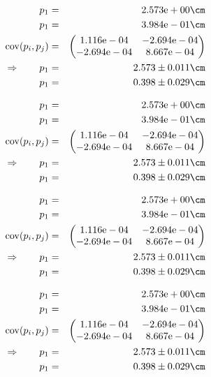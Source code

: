 \begin{eqnarray}
    p_1 &=& 2.573\mathrm{e}+00 \cm \nonumber \\
    p_1 &=& 3.984\mathrm{e}-01 \cm \nonumber \\
    \mathrm{cov}(p_i, p_j) &=& 
    \begin{pmatrix}
        1.116\mathrm{e}-04 &-2.694\mathrm{e}-04 \\
        -2.694\mathrm{e}-04 &8.667\mathrm{e}-04 \\
    \end{pmatrix}
\\ \Rightarrow \qquad
    p_1 &=& 2.573 \pm 0.011 \cm\\
    p_1 &=& 0.398 \pm 0.029 \cm
\end{eqnarray}

\begin{eqnarray}
    p_1 &=& 2.573\mathrm{e}+00 \cm \nonumber \\
    p_1 &=& 3.984\mathrm{e}-01 \cm \nonumber \\
    \mathrm{cov}(p_i, p_j) &=& 
    \begin{pmatrix}
        1.116\mathrm{e}-04 &-2.694\mathrm{e}-04 \\
        -2.694\mathrm{e}-04 &8.667\mathrm{e}-04 \\
    \end{pmatrix}
\\ \Rightarrow \qquad
    p_1 &=& 2.573 \pm 0.011 \cm\\
    p_1 &=& 0.398 \pm 0.029 \cm
\end{eqnarray}

\begin{eqnarray}
    p_1 &=& 2.573\mathrm{e}+00 \cm \nonumber \\
    p_1 &=& 3.984\mathrm{e}-01 \cm \nonumber \\
    \mathrm{cov}(p_i, p_j) &=& 
    \begin{pmatrix}
        1.116\mathrm{e}-04 &-2.694\mathrm{e}-04 \\
        -2.694\mathrm{e}-04 &8.667\mathrm{e}-04 \\
    \end{pmatrix}
\\ \Rightarrow \qquad
    p_1 &=& 2.573 \pm 0.011 \cm\\
    p_1 &=& 0.398 \pm 0.029 \cm
\end{eqnarray}

\begin{eqnarray}
    p_1 &=& 2.573\mathrm{e}+00 \cm \nonumber \\
    p_1 &=& 3.984\mathrm{e}-01 \cm \nonumber \\
    \mathrm{cov}(p_i, p_j) &=& 
    \begin{pmatrix}
        1.116\mathrm{e}-04 &-2.694\mathrm{e}-04 \\
        -2.694\mathrm{e}-04 &8.667\mathrm{e}-04 \\
    \end{pmatrix}
\\ \Rightarrow \qquad
    p_1 &=& 2.573 \pm 0.011 \cm\\
    p_1 &=& 0.398 \pm 0.029 \cm
\end{eqnarray}

